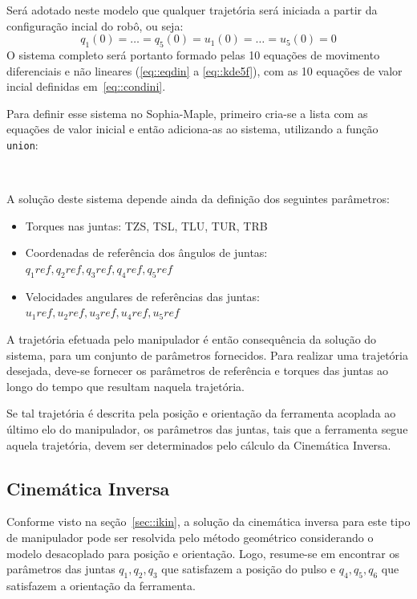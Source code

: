 Será adotado neste modelo que qualquer trajetória será iniciada a partir da
configuração incial do robô, ou seja:
%
\begin{equation}
	q_{1}(0) = \ldots = q_{5}(0) = u_{1}(0) = \ldots = u_{5}(0) = 0
	\label{eq::condini}
\end{equation}
%
O sistema completo será portanto formado pelas 10 equações de movimento
diferenciais e não lineares (\ref{eq::eqdin} a \ref{eq::kde5f}), com as 10
equações de valor incial definidas em~\ref{eq::condini}.

Para definir esse sistema no Sophia-Maple, primeiro cria-se a lista com as
equações de valor inicial e então adiciona-as ao sistema, utilizando a função
\texttt{union}:

\bigskip {} \\ 
		  \bigskip

A solução deste sistema depende ainda da definição dos seguintes parâmetros:
%
\begin{itemize}
  \item{Torques nas juntas: TZS, TSL, TLU, TUR, TRB}
  \item{Coordenadas de referência dos ângulos de juntas: 
  		\\ $q_{1}ref, q_{2}ref, q_{3}ref, q_{4}ref, q_{5}ref$}
  \item{Velocidades angulares de referências das juntas: 
  		\\ $u_{1}ref, u_{2}ref, u_{3}ref, u_{4}ref, u_{5}ref$}
\end{itemize}
%
A trajetória efetuada pelo manipulador é então consequência da solução do
sistema, para um conjunto de parâmetros fornecidos. Para realizar uma trajetória
desejada, deve-se fornecer os parâmetros de referência e torques das juntas ao
longo do tempo que resultam naquela trajetória.

Se tal trajetória é descrita pela posição e orientação da ferramenta acoplada ao
último elo do manipulador, os parâmetros das juntas, tais que a ferramenta
segue aquela trajetória, devem ser determinados pelo cálculo da Cinemática
Inversa.


\subsection{Cinemática Inversa}\label{sec::ikin_mh12}

Conforme visto na seção~\ref{sec::ikin}, a solução da cinemática inversa para
este tipo de manipulador pode ser resolvida pelo método geométrico considerando
o modelo desacoplado para posição e orientação.
Logo, resume-se em encontrar os parâmetros das juntas $q_{1}, q_{2}, q_{3}$ que
satisfazem a posição do pulso e $q_{4}, q_{5}, q_{6}$ que satisfazem a
orientação da ferramenta.

